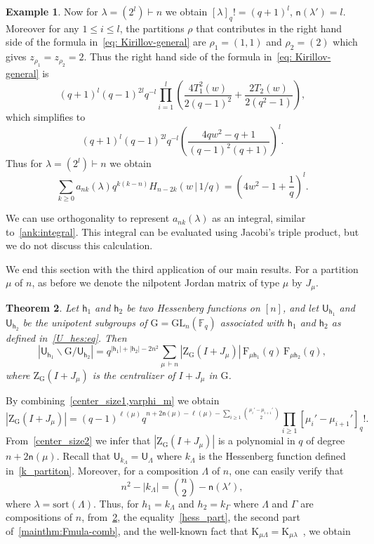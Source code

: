 \documentclass[12pt,a4paper,reqno]{amsart}
\theoremstyle{plain}
\newtheorem{theorem}{Theorem}[section]
\theoremstyle{definition}
\newtheorem{example}[theorem]{Example}
\newcommand{\FF}{{\mathbb{F}}}
\newcommand{\1}{\mathds{1}}
\newcommand{\G}{{\mathrm{G}}}
\newcommand{\GL}{\mathrm{GL}}
\newcommand{\F}{\mathrm{F}}
\newcommand{\cen}{\mathrm{Z}_\G}
\newcommand{\K}{{\mathrm{K}}}
\newcommand{\Z}{\mathrm{Z}}
\newcommand{\U}{\mathsf{U}}
\newcommand{\fn}{\mathsf{n}}
\newcommand{\hes}{\mathsf{h}}
\begin{document}
\begin{example}
Now for $\lambda=(2^l)\vdash n$ we obtain $[\lambda]_q!=(q+1)^l$, $\fn(\lambda')=l$. Moreover for any $1\leq i\leq l$, the partitions $\rho$ that contributes in the right hand side of the formula in~\cref{eq: Kirillov-general}  are $\rho_1=(1,1)$ and $\rho_2=(2)$ which gives $z_{\rho_1}=z_{\rho_2}=2$. Thus  the right hand side of the formula in~\cref{eq: Kirillov-general} is 
$$
(q+1)^l(q-1)^{2l}q^{-l}\prod_{i=1}^l\left(\frac{4T_1^2(w)}{2(q-1)^2}+\frac{2T_2(w)}{2(q^2-1)}\right),
$$ which simplifies to
$$
(q+1)^l(q-1)^{2l}q^{-l}\left(\frac{4qw^2-q+1}{(q-1)^2(q+1)}\right)^l.
$$
Thus for $\lambda=(2^l)\vdash n$ we obtain 
$$\sum_{k\geq 0} a_{nk}(\lambda)q^{k(k-n)}H_{n-2k}(w\,|\, 1/q)=\left(4w^2-1+\frac{1}{q}\right)^l. $$
\end{example}
We can use orthogonality to represent $a_{nk}(\lambda)$ as an integral, similar to~\cref{ank:integral}. This integral can be evaluated using Jacobi's triple product, but we do not  discuss this calculation. 





We end this section with the third application of our main results. For a partition $\mu$ of $n$, as before we denote the nilpotent Jordan matrix of type $\mu$ by $J_\mu$.  

\begin{theorem}\label{Double_cosets:thm}  Let $\hes_1$ and $\hes_2$ be two Hessenberg functions on $[n]$, and let $\U_{\hes_1}$ and $\U_{\hes_2}$ be the unipotent subgroups of $\G = \GL_n(\FF_q)$ associated with $\hes_1$ and $\hes_2$ as defined in~\cref{U_hes:eq}. Then
\begin{equation}\label{double-center}
\left|\U_{\hes_1}\backslash\G/\U_{\hes_2}\right|={q^{|\hes_1|+|\hes_2|-2n^2}}\sum_{\mu\, \vdash n} |\cen(I+J_\mu)|\,\F_{\mu\hes_1}(q)\,\F_{\mu\hes_2}(q),
\end{equation}
where $\cen(I+J_\mu)$ is the centralizer  of $I+J_\mu$ in $\G$.
\end{theorem}
By combining~\cref{center_size1,varphi_m} we obtain 
\begin{equation}\label{center_size2}
  \left|\cen(I+J_\mu)\right|=(q-1)^{\ell(\mu)}q^{n+2\fn(\mu)-\ell(\mu)-\sum_{i\geq 1}\binom{\mu_i'-\mu_{i+1}'}{2}}\prod_{i\geq 1}[\mu_i'-\mu_{i+1}']_q!.  
\end{equation}
From~\cref{center_size2} we infer that $|\Z_\G(I+J_\mu)|$ is a polynomial in $q$ of degree $n+2\fn(\mu)$. Recall that $\U_{k_\Lambda}=\U_\Lambda$ where $k_\Lambda$ is the Hessenberg function defined in~\cref{k_partiton}. Moreover, for a composition $\Lambda$ of $n$, one can easily verify that
\begin{equation}\label{hess_part}
n^2 - |k_\Lambda| = \binom{n}{2} - \fn(\lambda'),
\end{equation}
where $\lambda = \mathrm{sort}(\Lambda)$. Thus, for $h_1 = k_\Lambda$ and $h_2 = k_\Gamma$ where $\Lambda$ and $\Gamma$ are compositions of $n$, from~\cref{Double_cosets:thm}, the equality~\cref{hess_part}, the second part of~\cref{mainthm:Fmula-comb}, and the well-known fact that $\K_{\mu\Lambda} = \K_{\mu\lambda}$~\cite[Theorem 9.25]{Loehr}, we obtain
\end{document}

